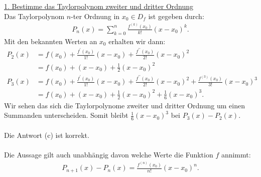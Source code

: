 \underline{1. Bestimme das Taylorpolynom zweiter und dritter Ordnung}\\
Das Taylorpolynom $n$-ter Ordnung in $x_0 \in D_f$ ist gegeben durch:
\begin{align*}
	P_n(x)
	=
	\sum \limits_{k=0}^n \frac{f^{(k)}(x_0)}{k!} (x-x_0)^k.
\end{align*}
Mit den bekannten Werten an $x_0$ erhalten wir dann:
\begin{align*}
	P_2(x)
	&=
	f(x_0) + \frac{f^\prime(x_0)}{1!} (x- x_0) + \frac{f^{\prime \prime}(x_0)}{2!} (x- x_0)^2\\
	&=
	f(x_0) +  (x- x_0) + \frac{1}{2} (x- x_0)^2\\
	P_3(x)
	&=
	f(x_0) + \frac{f^\prime(x_0)}{1!} (x- x_0) + \frac{f^{\prime \prime}(x_0)}{2!} (x- x_0)^2
	+ \frac{f^{(3)}(x_0)}{3!} (x - x_0)^3\\
	&=
	f(x_0) +  (x- x_0) + \frac{1}{2} (x- x_0)^2 + \frac{1}{6} (x - x_0 )^3.
\end{align*}
Wir sehen das sich die Taylorpolynome zweiter und dritter Ordnung um einen Summanden unterscheiden. Somit bleibt $\frac{1}{6} (x - x_0)^3$ bei $P_3(x) - P_2(x)$.\\
\\
Die Antwort (c) ist korrekt.\\
\\
Die Aussage gilt auch unabhängig davon welche Werte die Funktion $f$ annimmt:
\begin{align*}
	P_{n+1}(x) - P_n(x) = 
	\frac{f^{(n)}(x_0)}{n!}(x - x_0)^n. 
\end{align*} 

